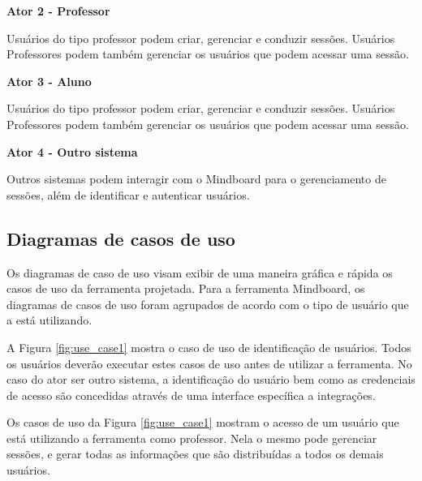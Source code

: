 \textbf{Ator 2 - Professor}

Usuários do tipo professor podem criar, gerenciar e conduzir sessões. Usuários Professores podem também gerenciar os usuários que podem acessar uma sessão.

\textbf{Ator 3 - Aluno}

Usuários do tipo professor podem criar, gerenciar e conduzir sessões. Usuários Professores podem também gerenciar os usuários que podem acessar uma sessão.

\textbf{Ator 4 - Outro sistema}

Outros sistemas podem interagir com o Mindboard para o gerenciamento de sessões, além de identificar e autenticar usuários.

\subsection{Diagramas de casos de uso}

Os diagramas de caso de uso visam exibir de uma maneira gráfica e rápida os casos de uso da ferramenta projetada. Para a ferramenta Mindboard, os diagramas de casos de uso foram agrupados de acordo com o tipo de usuário que a está utilizando. 

A Figura \ref{fig:use_case1} mostra o caso de uso de identificação de usuários. Todos os usuários deverão executar estes casos de uso antes de utilizar a ferramenta. No caso do ator ser outro sistema, a identificação do usuário bem como as credenciais de acesso são concedidas através de uma interface específica a integrações.
 

Os casos de uso da Figura \ref{fig:use_case1} mostram o acesso de um usuário que está utilizando a ferramenta como professor. Nela o mesmo pode gerenciar sessões, e gerar todas as informações que são distribuídas a todos os demais usuários.

 


